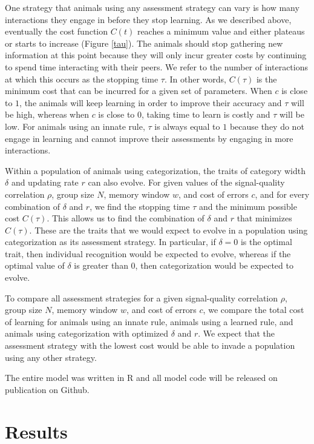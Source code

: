 One strategy that animals using any assessment strategy can vary is how many interactions they engage in before they stop learning. As we described above, eventually the cost function $C(t)$ reaches a minimum value and either plateaus or starts to increase (Figure \ref{tau}). The animals should stop gathering new information at this point because they will only incur greater costs by continuing to spend time interacting with their peers. We refer to the number of interactions at which this occurs as the stopping time $\tau$. In other words, $C(\tau)$ is the minimum cost that can be incurred for a given set of parameters. When $c$ is close to $1$, the animals will keep learning in order to improve their accuracy and $\tau$ will be high, whereas when $c$ is close to $0$, taking time to learn is costly and $\tau$ will be low. For animals using an innate rule, $\tau$ is always equal to $1$ because they do not engage in learning and cannot improve their assessments by engaging in more interactions. 

Within a population of animals using categorization, the traits of category width $\delta$ and updating rate $r$ can also evolve. For given values of the signal-quality correlation $\rho$,  group size $N$, memory window $w$, and cost of errors $c$, and for every combination of $\delta$ and $r$, we find the stopping time $\tau$ and the minimum possible cost $C(\tau)$. This allows us to find the combination of $\delta$ and $r$ that minimizes $C(\tau)$. These are the traits that we would expect to evolve in a population using categorization as its assessment strategy. In particular, if $\delta=0$ is the optimal trait, then individual recognition would be expected to evolve, whereas if the optimal value of $\delta$ is greater than $0$, then categorization would be expected to evolve.  

To compare all assessment strategies for a given signal-quality correlation $\rho$, group size $N$, memory window $w$, and cost of errors $c$, we compare the total cost of learning for animals using an innate rule, animals using a learned rule, and animals using categorization with optimized $\delta$ and $r$. We expect that the assessment strategy with the lowest cost would be able to invade a population using any other strategy.


The entire model was written in R and all model code will be released on publication on Github.

\section*{Results}

